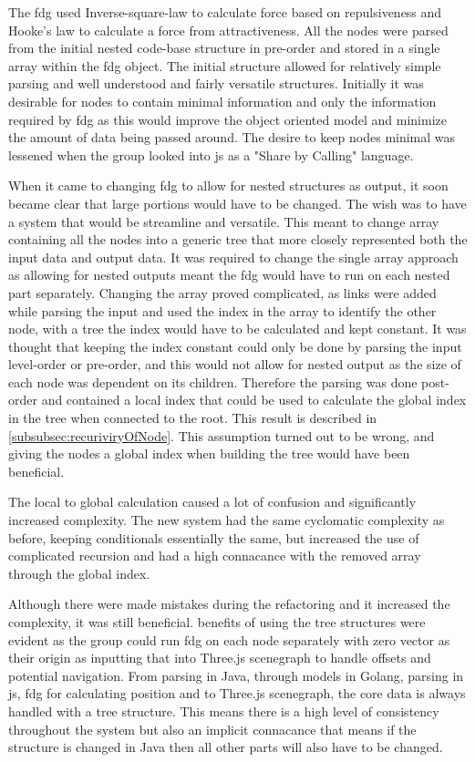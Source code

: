 The \gls{fdg} used Inverse-square-law to calculate force based on repulsiveness and Hooke's law to calculate a force from attractiveness. All the nodes were parsed from the initial nested code-base structure in pre-order and stored in a single array within the \gls{fdg} object.
The initial structure allowed for relatively simple parsing and well understood and fairly versatile structures. Initially it was desirable for nodes to contain minimal information and only the information required by \gls{fdg} as this would improve the object oriented model and minimize the amount of data being passed around. The desire to keep nodes minimal was lessened when the group looked into \gls{js} as a "Share by Calling" language. 

When it came to changing \gls{fdg} to allow for nested structures as output, it soon became clear that large portions would have to be changed. The wish was to have a system that would be streamline and versatile. This meant to change array containing all the nodes into a generic tree that more closely represented both the input data and output data. It was required to change the single array approach as allowing for nested outputs meant the \gls{fdg} would have to run on each nested part separately. Changing the array proved complicated, as links were added while parsing the input and used the index in the array to identify the other node, with a tree the index would have to be calculated and kept constant. It was thought that keeping the index constant could only be done by parsing the input level-order or pre-order, and this would not allow for nested output as the size of each node was dependent on its children. Therefore the parsing was done post-order and contained a local index that could be used to calculate the global index in the tree when connected to the root. This result is described in \ref{subsubsec:recuriviryOfNode}. This assumption turned out to be wrong, and giving the nodes a global index when building the tree would have been beneficial.

The local to global calculation caused a lot of confusion and significantly increased complexity. The new system had the same cyclomatic complexity as before, keeping conditionals essentially the same, but increased the use of complicated \gls{recursion} and had a high connacance with the removed array through the global index.

Although there were made mistakes during the refactoring and it increased the complexity, it was still beneficial. benefits of using the tree structures were evident as the group could run \gls{fdg} on each node separately with zero vector as their origin as inputting that into Three.js \gls{scenegraph} to handle offsets and potential navigation. From parsing in Java, through models in Golang, parsing in \gls{js}, \gls{fdg} for calculating position and to Three.js \gls{scenegraph}, the core data is always handled with a tree structure. This means there is a high level of consistency throughout the system but also an implicit connacance that means if the structure is changed in Java then all other parts will also have to be changed.


